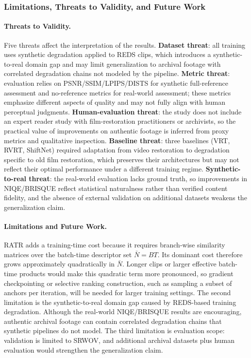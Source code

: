 \documentclass[symmetry,article,submit,pdftex,moreauthors]{Definitions/mdpi}
\begin{document}
\subsubsection{Limitations, Threats to Validity, and Future Work}
\label{subsec:limitations}

\paragraph{Threats to Validity.}
Five threats affect the interpretation of the results. \textbf{Dataset threat}: all training uses synthetic degradation applied to REDS clips, which introduces a synthetic-to-real domain gap and may limit generalization to archival footage with correlated degradation chains not modeled by the pipeline. \textbf{Metric threat}: evaluation relies on PSNR/SSIM/LPIPS/DISTS for synthetic full-reference assessment and no-reference metrics for real-world assessment; these metrics emphasize different aspects of quality and may not fully align with human perceptual judgments. \textbf{Human-evaluation threat}: the study does not include an expert reader study with film-restoration practitioners or archivists, so the practical value of improvements on authentic footage is inferred from proxy metrics and qualitative inspection. \textbf{Baseline threat}: three baselines (VRT, RVRT, ShiftNet) required adaptation from video restoration to degradation specific to old film restoration, which preserves their architectures but may not reflect their optimal performance under a different training regime. \textbf{Synthetic-to-real threat}: the real-world evaluation lacks ground truth, so improvements in NIQE/BRISQUE reflect statistical naturalness rather than verified content fidelity, and the absence of external validation on additional datasets weakens the generalization claim.

\paragraph{Limitations and Future Work.}
RATR adds a training-time cost because it requires branch-wise similarity matrices over the batch-time descriptor set $\bar{N}=BT$. Its dominant cost therefore grows approximately quadratically in $\bar{N}$. Longer clips or larger effective batch-time products would make this quadratic term more pronounced, so gradient checkpointing or selective ranking construction, such as sampling a subset of anchors per iteration, will be needed for larger training settings. The second limitation is the synthetic-to-real domain gap caused by REDS-based training degradation. Although the real-world NIQE/BRISQUE results are encouraging, authentic archival footage can contain correlated degradation chains that synthetic pipelines do not model. The third limitation is evaluation scope: validation is limited to SRWOV, and additional archival datasets plus human evaluation would strengthen the generalization claim.
\end{document}
